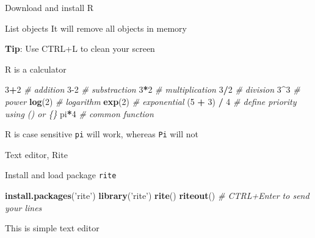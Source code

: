 \documentclass[
  ignorenonframetext,
]{beamer}
\newenvironment{Shaded}{\begin{snugshade}}{\end{snugshade}}
\newcommand{\CommentTok}[1]{\textcolor[rgb]{0.56,0.35,0.01}{\textit{#1}}}
\newcommand{\DecValTok}[1]{\textcolor[rgb]{0.00,0.00,0.81}{#1}}
\newcommand{\KeywordTok}[1]{\textcolor[rgb]{0.13,0.29,0.53}{\textbf{#1}}}
\newcommand{\NormalTok}[1]{#1}
\newcommand{\OperatorTok}[1]{\textcolor[rgb]{0.81,0.36,0.00}{\textbf{#1}}}
\newcommand{\StringTok}[1]{\textcolor[rgb]{0.31,0.60,0.02}{#1}}
\begin{document}
\begin{frame}[fragile]{Download and install R}
\begin{block}{List objects}
It will remove all objects in memory

\textbf{Tip}: Use CTRL+L to clean your screen

\RCALCULATOR

\end{block}

\begin{block}{R is a calculator}

\begin{Shaded}
\begin{Highlighting}[]
\DecValTok{3}\OperatorTok{+}\DecValTok{2} \CommentTok{# addition}
\DecValTok{3-2} \CommentTok{# substraction}
\DecValTok{3}\OperatorTok{*}\DecValTok{2} \CommentTok{# multiplication}
\DecValTok{3}\OperatorTok{/}\DecValTok{2} \CommentTok{# division}
\DecValTok{3}\OperatorTok{^}\DecValTok{3} \CommentTok{# power}
\KeywordTok{log}\NormalTok{(}\DecValTok{2}\NormalTok{) }\CommentTok{# logarithm}
\KeywordTok{exp}\NormalTok{(}\DecValTok{2}\NormalTok{) }\CommentTok{# exponential}
\NormalTok{(}\DecValTok{5} \OperatorTok{+}\StringTok{ }\DecValTok{3}\NormalTok{) }\OperatorTok{/}\StringTok{ }\DecValTok{4} \CommentTok{# define priority using () or \{\} }
\NormalTok{pi}\OperatorTok{*}\DecValTok{4} \CommentTok{# common function}
\end{Highlighting}
\end{Shaded}

R is case sensitive {\texttt{pi}} will work, whereas {\texttt{Pi}} will
not

\EDITOR

\end{block}

\begin{block}{Text editor, Rite}

Install and load package {\texttt{rite}}

\begin{Shaded}
\begin{Highlighting}[]
\KeywordTok{install.packages}\NormalTok{(}\StringTok{'rite'}\NormalTok{)}
\KeywordTok{library}\NormalTok{(}\StringTok{'rite'}\NormalTok{)}
\KeywordTok{rite}\NormalTok{()}
\KeywordTok{riteout}\NormalTok{() }\CommentTok{# CTRL+Enter to send your lines}
\end{Highlighting}
\end{Shaded}

This is simple text editor

\READINGDATA

\end{block}


\end{frame}
\end{document}
